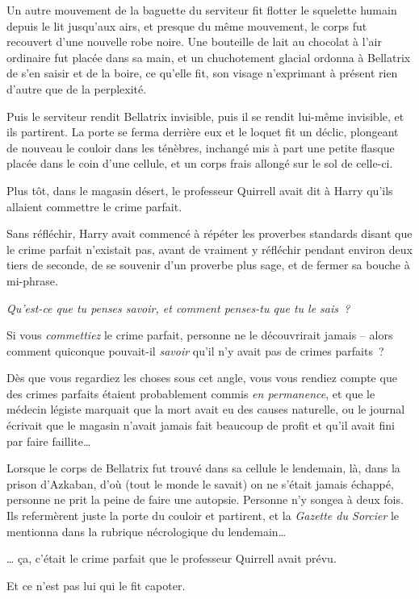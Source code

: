 Un autre mouvement de la baguette du serviteur fit flotter le squelette humain depuis le lit jusqu'aux airs, et presque du même mouvement, le corps fut recouvert d'une nouvelle robe noire.
Une bouteille de lait au chocolat à l'air ordinaire fut placée dans sa main, et un chuchotement glacial ordonna à Bellatrix de s'en saisir et de la boire, ce qu'elle fit, son visage n'exprimant à présent rien d'autre que de la perplexité.

Puis le serviteur rendit Bellatrix invisible, puis il se rendit lui-même invisible, et ils partirent.
La porte se ferma derrière eux et le loquet fit un déclic, plongeant de nouveau le couloir dans les ténèbres, inchangé mis à part une petite flasque placée dans le coin d'une cellule, et un corps frais allongé sur le sol de celle-ci.

\later

Plus tôt, dans le magasin désert, le professeur Quirrell avait dit à Harry qu'ils allaient commettre le crime parfait.

Sans réfléchir, Harry avait commencé à répéter les proverbes standards disant que le crime parfait n'existait pas, avant de vraiment y réfléchir pendant environ deux tiers de seconde, de se souvenir d'un proverbe plus sage, et de fermer sa bouche à mi-phrase.

\emph{Qu'est-ce que tu penses savoir, et comment penses-tu que tu le sais~?}

Si vous \emph{commettiez} le crime parfait, personne ne le découvrirait jamais -- alors comment quiconque pouvait-il \emph{savoir} qu'il n'y avait pas de crimes parfaits~?

Dès que vous regardiez les choses sous cet angle, vous vous rendiez compte que des crimes parfaits étaient probablement commis \emph{en permanence}, et que le médecin légiste marquait que la mort avait eu des causes naturelle, ou le journal écrivait que le magasin n'avait jamais fait beaucoup de profit et qu'il avait fini par faire faillite…

Lorsque le corps de Bellatrix fut trouvé dans sa cellule le lendemain, là, dans la prison d'Azkaban, d'où (tout le monde le savait) on ne s'était jamais échappé, personne ne prit la peine de faire une autopsie.
Personne n'y songea à deux fois.
Ils refermèrent juste la porte du couloir et partirent, et la \emph{Gazette du Sorcier} le mentionna dans la rubrique nécrologique du lendemain…

… ça, c'était le crime parfait que le professeur Quirrell avait prévu.

Et ce n'est pas lui qui le fit capoter.
